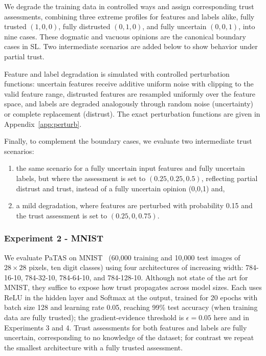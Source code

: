 We degrade the training data in controlled ways and assign corresponding trust assessments, combining three extreme profiles for features and labels alike, fully trusted \((1,0,0)\), fully distrusted \((0,1,0)\), and fully uncertain \((0,0,1)\), into nine cases. These dogmatic and vacuous opinions are the canonical boundary cases in SL. Two intermediate scenarios are added below to show behavior under partial trust.

Feature and label degradation is simulated with controlled perturbation functions: uncertain features receive additive uniform noise with clipping to the valid feature range, distrusted features are resampled uniformly over the feature space, and labels are degraded analogously through random noise (uncertainty) or complete replacement (distrust). The exact perturbation functions are given in Appendix~\ref{app:perturb}.

Finally, to complement the boundary cases, we evaluate two intermediate trust scenarios: 
\begin{enumerate}[label=\roman*.]
    \item the same scenario for a fully uncertain input features and fully uncertain labels, but where the assessment is set to \((0.25, 0.25, 0.5)\), reflecting partial distrust and trust, instead of a fully uncertain opinion (0,0,1) and,
    \item a mild degradation, where features are perturbed with probability 0.15 and the trust assessment is set to \((0.25, 0, 0.75)\).
    
\end{enumerate}

\subsubsection{Experiment 2 - MNIST}\label{exp:2}

We evaluate PaTAS on MNIST~\cite{lecun1998mnist} (60{,}000 training and 10{,}000 test images of \(28\times28\) pixels, ten digit classes) using four architectures of increasing width: 784-16-10, 784-32-10, 784-64-10, and 784-128-10. Although not state of the art for MNIST, they suffice to expose how trust propagates across model sizes. Each uses ReLU in the hidden layer and Softmax at the output, trained for 20 epochs with batch size 128 and learning rate 0.05, reaching 99\% test accuracy (when training data are fully trusted); the gradient-evidence threshold is $\epsilon = 0.05$ here and in Experiments 3 and 4. Trust assessments for both features and labels are fully uncertain, corresponding to no knowledge of the dataset; for contrast we repeat the smallest architecture with a fully trusted assessment.

